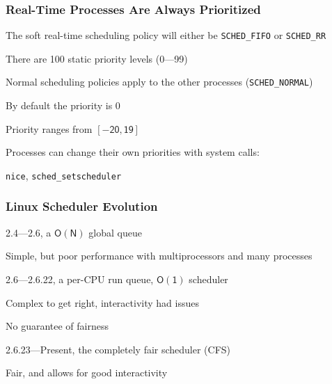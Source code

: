   \begin{frame}
    \frametitle{Real-Time Processes Are Always Prioritized}

    The soft real-time scheduling policy will either be \texttt{SCHED\_FIFO}
    or \texttt{SCHED\_RR}

    \hspace{2em} There are 100 static priority levels (0---99)

    \vspace{2em}

    Normal scheduling policies apply to the other processes
    (\texttt{SCHED\_NORMAL})

    \hspace{2em} By default the priority is 0

    \hspace{2em} Priority ranges from $\mathsf{[-20, 19]}$

    \hspace{2em}

    Processes can change their own priorities with system calls:

    \hspace{2em} \texttt{nice}, \texttt{sched\_setscheduler}
  \end{frame}

  \begin{frame}
    \frametitle{Linux Scheduler Evolution}

    2.4---2.6, a $\mathsf{O(N)}$ global queue

    \hspace{2em} Simple, but poor performance with multiprocessors and many processes

    \vspace{2em}

    2.6---2.6.22, a per-CPU run queue, $\mathsf{O(1)}$ scheduler

    \hspace{2em} Complex to get right, interactivity had issues

    \hspace{2em} No guarantee of fairness

    \vspace{2em}

    2.6.23---Present, the completely fair scheduler (CFS)

    \hspace{2em} Fair, and allows for good interactivity
  \end{frame}

